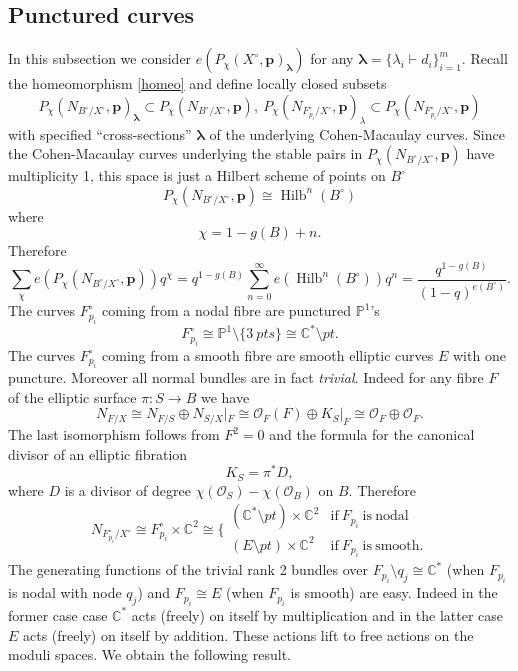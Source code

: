 \documentclass[12pt]{amsart}
\theoremstyle{definition}
\theoremstyle{property}
\renewcommand\O{\mathcal O}
\newcommand\PP{\mathbb P}
\newcommand\p{\mathbf{p}}
\newcommand\bslambda{\boldsymbol{\lambda}}
\newcommand\C{\mathbb C}
\renewcommand\_{^{}_}
\newcommand\Hilb{\operatorname{Hilb}}
\begin{document}
\subsection{Punctured curves}

In this subsection we consider $e(P_{\chi}(X^{\circ},\p)_{\bslambda})$ for any $\bslambda = \{\lambda_i \vdash d_i\}_{i=1}^{m}$. Recall the homeomorphism \eqref{homeo} and define locally closed subsets
$$
P_{\chi}(N_{B^{\circ} / X^\circ}, \p)_{\bslambda} \subset P_{\chi}(N_{B^{\circ} / X^\circ}, \p), \ P_{\chi}(N_{F_{p_i}^{\circ} / X^\circ}, \p)_{\lambda} \subset P_{\chi}(N_{F_{p_i}^{\circ} / X^\circ}, \p)
$$
with specified ``cross-sections'' $\bslambda$ of the underlying Cohen-Macaulay curves. Since the Cohen-Macaulay curves underlying the stable pairs in $P_{\chi}(N_{B^{\circ} / X^\circ}, \p)$ have multiplicity 1, this space is just a Hilbert scheme of points on $B^\circ$ \cite{Pandharipande-Thomas3}
\[
P_{\chi}(N_{B^{\circ} / X^\circ}, \p) \cong \Hilb^n(B^{\circ})
\]
where
$$
\chi = 1 - g(B) + n.
$$
Therefore
\begin{equation} \label{secgenfun}
\sum_{\chi} e(P_{\chi}(N_{B^{\circ} / X^\circ}, \p)) q^{\chi} = q^{1-g(B)} \sum_{n = 0}^{\infty} e(\Hilb^n(B^{\circ})) q^n = \frac{q^{1-g(B)}}{(1-q)^{e(B^{\circ})}}.
\end{equation}
The curves $F_{p_i}^{\circ}$ coming from a nodal fibre are punctured $\PP^1$'s
$$
F_{p_i}^{\circ} \cong \PP^1 \setminus \{3 \ pts\} \cong \C^{*} \setminus pt.
$$
The curves $F_{p_i}^{\circ}$ coming from a smooth fibre are smooth elliptic curves $E$ with one puncture. Moreover all normal bundles are in fact \emph{trivial}. Indeed for any fibre $F$ of the elliptic surface $\pi : S \rightarrow B$ we have
$$
N_{F / X} \cong N_{F/S} \oplus N_{S/X}|_{F} \cong \O_{F}(F) \oplus K_{S}|_{F} \cong \O_{F} \oplus \O_{F}.
$$ 
The last isomorphism follows from $F^2 = 0$ and the formula for the canonical divisor of an elliptic fibration \cite{Mir}
$$
K_S = \pi^* D,
$$
where $D$ is a divisor of degree $\chi(\O_S) - \chi(\O_B)$ on $B$. Therefore
$$
N_{F_{p_i}^{\circ} / X^\circ} \cong F_{p_i}^{\circ} \times \C^2 \cong \Big\{ \begin{array}{cc} (\C^{*} \setminus pt) \times \C^2 & \mathrm{if } \ F_{p_i} \ \mathrm{is \ nodal} \\ (E \setminus pt) \times \C^2 & \mathrm{if } \ F_{p_i} \ \mathrm{is \ smooth.} \end{array}
$$
The generating functions of the trivial rank 2 bundles over $F_{p_i} \setminus q_j \cong \C^*$ (when $F_{p_i}$ is nodal with node $q_j$) and $F_{p_i} \cong E$ (when $F_{p_i}$ is smooth) are easy. Indeed in the former case case $\C^*$ acts (freely) on itself by multiplication and in the latter case $E$ acts (freely) on itself by addition. These actions lift to free actions on the moduli spaces. We obtain the following result.
\end{document}
